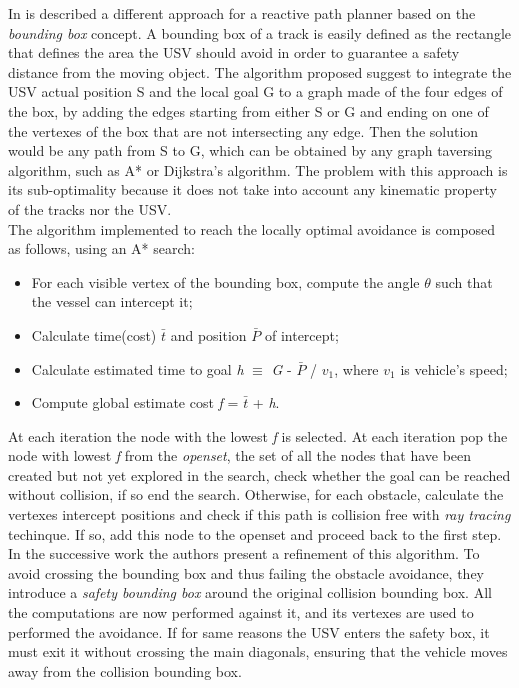 \documentclass[journal]{IEEEtran}
\begin{document}
  \indent In \cite{Casalino2009} is described a different approach for a reactive path planner based on the \textit{bounding box} concept. A bounding box of a track is easily defined as the rectangle that defines the area the USV should avoid in order to guarantee a safety distance from the moving object. The algorithm proposed suggest to integrate the USV actual position S and the local goal G to a graph made of the four edges of the box, by adding the edges starting from either S or G and ending on one of the vertexes of the box that are not intersecting any edge. Then the solution would be any path from S to G, which can be obtained by any graph taversing algorithm, such as A* or Dijkstra's algorithm. The problem with this approach is its sub-optimality because it does not take into account any kinematic property of the tracks nor the USV.\\
  The algorithm implemented to reach the locally optimal avoidance is composed as follows, using an A* search:
  \begin{itemize}
        \item For each visible vertex of the bounding box, compute the angle $\theta$ such that the vessel can intercept it;
        \item Calculate time(cost) \textit{$\bar{t}$} and position $\bar{P}$ of intercept;
        \item Calculate estimated time to goal \textit{h} $\equiv$ \textit{G} - \textit{$\bar{P}$} / \textit{$v_1$}, where \textit{$v_1$} is vehicle's speed;
        \item Compute global estimate cost \textit{f} = \textit{$\bar{t}$} + \textit{h}.
  \end{itemize}
  At each iteration the node with the lowest \textit{f} is selected. At each iteration pop the node with lowest \textit{f} from the \textit{openset}, the set of all the nodes that have been created but not yet explored in the search, check whether the goal can be reached without collision, if so end the search. Otherwise, for each obstacle, calculate the vertexes intercept positions and check if this path is collision free with \textit{ray tracing} techinque. If so, add this node to the openset and proceed back to the first step.\\
  \indent In the successive work \cite{Simetti2014} the authors present a refinement of this algorithm. To avoid crossing the bounding box and thus failing the obstacle avoidance, they introduce a \textit{safety bounding box} around the original collision bounding box. All the computations are now performed against it, and its vertexes are used to performed the avoidance. If for same reasons the USV enters the safety box, it must exit it without crossing the main diagonals, ensuring that the vehicle moves away from the collision bounding box.\\
\end{document}
